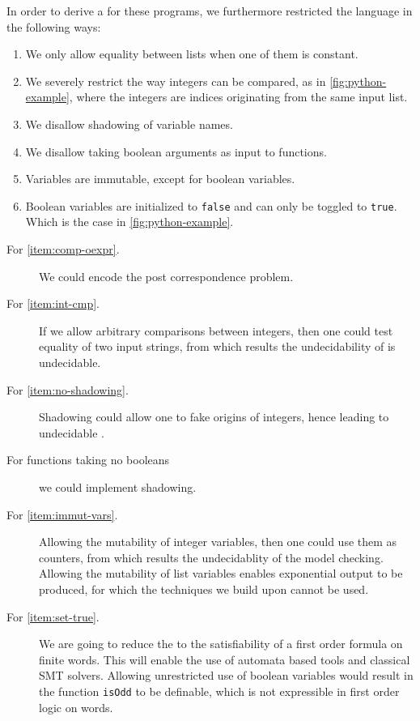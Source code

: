 In order to derive a  for these programs, we furthermore restricted the 
language in the following ways:
\begin{enumerate}
    \item \label{item:comp-oexpr}
        We only allow equality between lists when one of them is constant.
    \item \label{item:int-cmp} 
        We severely restrict the way integers can be compared, as
        in \cref{fig:python-example}, where the integers are indices originating
        from the same input list.
    \item \label{item:no-shadowing} 
        We disallow shadowing of variable names.
    \item \label{item:func-no-bool}
        We disallow taking boolean arguments as input 
        to functions.
    \item \label{item:immut-vars} 
        Variables are immutable, except for boolean variables.
    \item \label{item:set-true}
        Boolean variables are initialized to \texttt{false} and can only
        be toggled to \texttt{true}. Which is the case
        in \cref{fig:python-example}.
\end{enumerate}
\begin{description}
    \item[For \cref{item:comp-oexpr}.]
        We could encode the post correspondence problem.
    \item[For \cref{item:int-cmp}.] If we allow arbitrary comparisons between
        integers, then one could test equality of two input strings, from
        which results the undecidability of  is undecidable.
    \item[For \cref{item:no-shadowing}.]  Shadowing could allow one to 
        fake origins of integers, hence leading to undecidable .
    \item[For functions taking no booleans]
        we could implement shadowing.
    \item[For \cref{item:immut-vars}.]
        Allowing the mutability of integer variables, then one could 
        use them as counters, from which results the undecidablity of the
        model checking.
        Allowing  the mutability of list variables 
        enables exponential output to be produced, for which the techniques 
        we build upon cannot be used.
    \item[For \cref{item:set-true}.]
        We are going to reduce the  to 
        the satisfiability of a first order formula on finite words. This
        will enable the use of automata based tools and classical SMT solvers.
        Allowing unrestricted use of boolean variables would result in the 
        function \texttt{isOdd} to be definable, which is not expressible in 
        first order logic on words.
\end{description}

